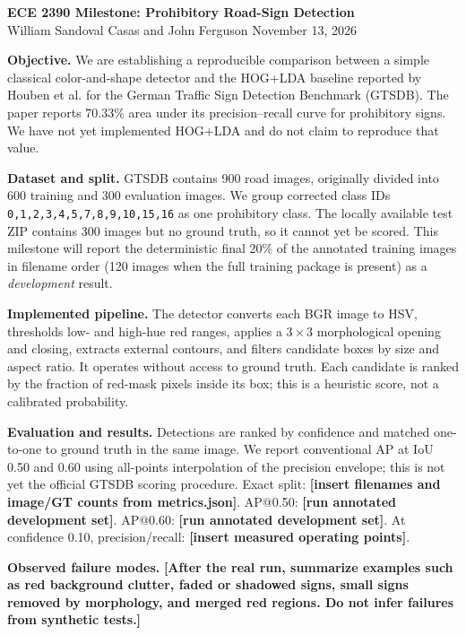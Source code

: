 \documentclass[10pt]{article}
\newcommand{\pending}[1]{\textcolor{red!70!black}{\textbf{[#1]}}}
\begin{document}
\begin{center}
{\Large\textbf{ECE 2390 Milestone: Prohibitory Road-Sign Detection}}\\[-0.1em]
William Sandoval Casas and John Ferguson \hfill November 13, 2026
\end{center}

\textbf{Objective.}
We are establishing a reproducible comparison between a simple classical
color-and-shape detector and the HOG+LDA baseline reported by Houben et al. for
the German Traffic Sign Detection Benchmark (GTSDB). The paper reports 70.33\%
area under its precision--recall curve for prohibitory signs. We have not yet
implemented HOG+LDA and do not claim to reproduce that value.

\textbf{Dataset and split.}
GTSDB contains 900 road images, originally divided into 600 training and 300
evaluation images. We group corrected class IDs
\texttt{0,1,2,3,4,5,7,8,9,10,15,16} as one prohibitory class. The locally
available test ZIP contains 300 images but no ground truth, so it cannot yet be
scored. This milestone will report the deterministic final 20\% of the
annotated training images in filename order (120 images when the full training
package is present) as a \emph{development} result.

\textbf{Implemented pipeline.}
The detector converts each BGR image to HSV, thresholds low- and high-hue red
ranges, applies a $3\times3$ morphological opening and closing, extracts
external contours, and filters candidate boxes by size and aspect ratio. It
operates without access to ground truth. Each candidate is ranked by the
fraction of red-mask pixels inside its box; this is a heuristic score, not a
calibrated probability.

\textbf{Evaluation and results.}
Detections are ranked by confidence and matched one-to-one to ground truth in
the same image. We report conventional AP at IoU 0.50 and 0.60 using all-points
interpolation of the precision envelope; this is not yet the official GTSDB
scoring procedure. Exact split: \pending{insert filenames and image/GT counts
from metrics.json}. AP@0.50: \pending{run annotated development set}.
AP@0.60: \pending{run annotated development set}. At confidence 0.10,
precision/recall: \pending{insert measured operating points}.

\textbf{Observed failure modes.}
\pending{After the real run, summarize examples such as red background clutter,
faded or shadowed signs, small signs removed by morphology, and merged red
regions. Do not infer failures from synthetic tests.}
\end{document}
